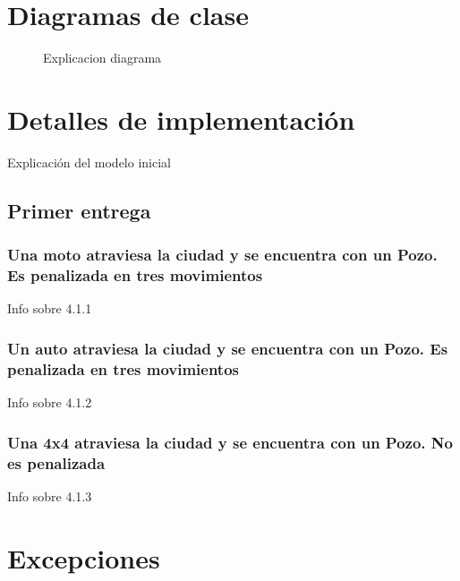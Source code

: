 \documentclass[titlepage,a4paper]{article}
\begin{document}
\section{Diagramas de clase}\label{sec:diagramasdeclase}

\begin{figure}[H]
\centering
\caption{\label{fig:class01}Explicacion diagrama}
\end{figure}

\section{Detalles de implementación}\label{sec:implementacion}

Explicación del modelo inicial

\subsection{Primer entrega}

\subsubsection[]{Una moto atraviesa la ciudad y se encuentra con un Pozo. Es penalizada en tres movimientos}

Info sobre 4.1.1

\subsubsection[]{Un auto atraviesa la ciudad y se encuentra con un Pozo. Es penalizada en tres movimientos}

Info sobre 4.1.2

\subsubsection[]{Una 4x4 atraviesa la ciudad y se encuentra con un Pozo. No es penalizada}

Info sobre 4.1.3

\section{Excepciones}\label{sec:excepciones}
\end{document}
